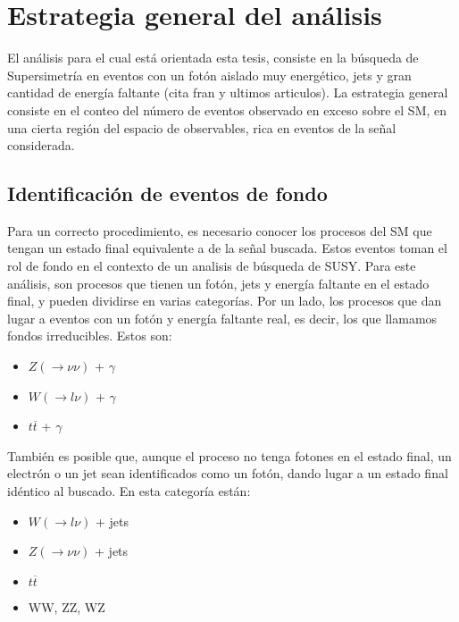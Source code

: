 \chapter{Estrategia general del análisis}


El análisis para el cual está orientada esta tesis, consiste en la búsqueda de Supersimetría en eventos con un fotón aislado muy energético, jets y gran cantidad de energía faltante (cita fran y ultimos articulos). La estrategia general consiste en el conteo del número de eventos observado en exceso sobre el SM, en una cierta región del espacio de observables, rica en eventos de la señal considerada.


\section{Identificación de eventos de fondo}

Para un correcto procedimiento, es necesario conocer los procesos del SM que tengan un estado final equivalente a de la señal buscada. Estos eventos toman el rol de fondo en el contexto de un analisis de búsqueda de SUSY. Para este análisis, son procesos que tienen un fotón, jets y energía faltante en el estado final, y pueden dividirse en varias categorías. Por un lado, los procesos que dan lugar a eventos con un fotón y energía faltante
real, es decir, los que llamamos fondos irreducibles. Estos son:

\begin{itemize}

	\item $Z(\rightarrow \nu\nu)$ + $\gamma$

	\item $W (\rightarrow l\nu)$ + $\gamma$

	\item $t \overline{t}$ + $\gamma$

\end{itemize}

También es posible que, aunque el proceso no tenga fotones en el estado final, un electrón o un jet sean identificados como un fotón, dando lugar a un estado final idéntico al buscado. En esta categoría están:

\begin{itemize}

	\item $W (\rightarrow l\nu)$ + jets

	\item $Z (\rightarrow \nu\nu)$ + jets

	\item $t \overline{t}$

	\item WW, ZZ, WZ

\end{itemize}

